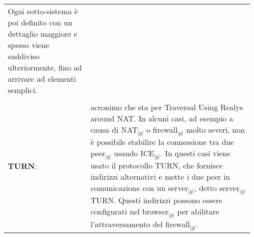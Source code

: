 \begin{longtable}{p{} p{}}
						Ogni sotto-sistema è poi definito con un dettaglio maggiore e spesso viene suddiviso ulteriormente, fino ad arrivare ad elementi semplici.\\
	    \\
	    \textbf{TURN}: 		&	acronimo che sta per Traversal Using Realys around NAT. In alcuni casi, ad esempio a causa di NAT$_{|g|}$ o firewall$_{|g|}$ molto severi, non è possibile stabilire la connessione tra due peer$_{|g|}$ usando ICE$_{|g|}$. In questi casi viene usato il 
						protocollo TURN, che fornisce indirizzi alternativi e mette i due peer in comunicazione con un server$_{|g|}$, detto server$_{|g|}$ TURN. Questi indirizzi possono essere configurati nel browser$_{|g|}$ per abilitare l’attraversamento del firewall$_{|g|}$.\\
	\end{longtable}
\newpage


